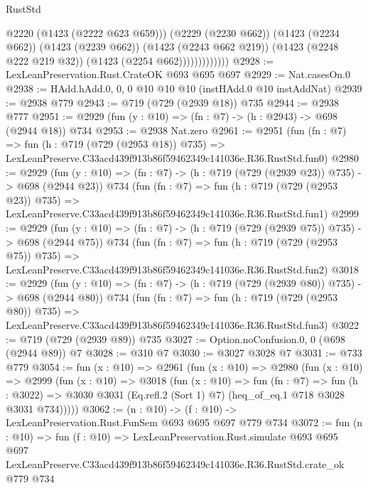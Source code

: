\begin{lexlean}{RustStd}
\begin{coremodule}
                            @2220
                            (@1423 (@2222 @623 @659)))
                          (@2229 (@2230 @662))
                          (@1423 (@2234 @662))
                          (@1423 (@2239 @662))
                          (@1423 (@2243 @662 @219))
                          (@1423 (@2248 @222 @219 @32))
                          (@1423 (@2254 @662)))))))))))))
@2928 := LexLeanPreservation.Rust.CrateOK @693 @695 @697
@2929 := Nat.casesOn.{0}
@2938 := HAdd.hAdd.{0, 0, 0} @10 @10 @10 (instHAdd.{0} @10 instAddNat)
@2939 := @2938 @779
@2943 := @719 (@729 (@2939 @18)) @735
@2944 := @2938 @777
@2951 := @2929 (fun (y : @10) => (fn : @7) -> (h : @2943) -> @698 (@2944 @18)) @734
@2953 := @2938 Nat.zero
@2961 := @2951
    (fun (fn : @7) =>
    fun (h : @719 (@729 (@2953 @18)) @735) =>
    LexLeanPreserve.C33acd439f913b86f59462349c141036e.R36.RustStd.fun0)
@2980 := @2929
    (fun (y : @10) => (fn : @7) -> (h : @719 (@729 (@2939 @23)) @735) -> @698 (@2944 @23))
    @734
    (fun (fn : @7) =>
    fun (h : @719 (@729 (@2953 @23)) @735) =>
    LexLeanPreserve.C33acd439f913b86f59462349c141036e.R36.RustStd.fun1)
@2999 := @2929
    (fun (y : @10) => (fn : @7) -> (h : @719 (@729 (@2939 @75)) @735) -> @698 (@2944 @75))
    @734
    (fun (fn : @7) =>
    fun (h : @719 (@729 (@2953 @75)) @735) =>
    LexLeanPreserve.C33acd439f913b86f59462349c141036e.R36.RustStd.fun2)
@3018 := @2929
    (fun (y : @10) => (fn : @7) -> (h : @719 (@729 (@2939 @80)) @735) -> @698 (@2944 @80))
    @734
    (fun (fn : @7) =>
    fun (h : @719 (@729 (@2953 @80)) @735) =>
    LexLeanPreserve.C33acd439f913b86f59462349c141036e.R36.RustStd.fun3)
@3022 := @719 (@729 (@2939 @89)) @735
@3027 := Option.noConfusion.{0, 0} (@698 (@2944 @89)) @7
@3028 := @310 @7
@3030 := @3027 @3028 @7
@3031 := @733 @779
@3054 := fun (x : @10) =>
  @2961
    (fun (x : @10) =>
    @2980
      (fun (x : @10) =>
      @2999
        (fun (x : @10) =>
        @3018
          (fun (x : @10) =>
          fun (fn : @7) =>
          fun (h : @3022) =>
          @3030 @3031 (Eq.refl.{2} (Sort 1) @7) (heq_of_eq.{1} @718 @3028 @3031 @734)))))
@3062 := (n : @10) -> (f : @10) -> LexLeanPreservation.Rust.FunSem @693 @695 @697 @779 @734
@3072 := fun (n : @10) =>
  fun (f : @10) =>
  LexLeanPreservation.Rust.simulate
    @693
    @695
    @697
    LexLeanPreserve.C33acd439f913b86f59462349c141036e.R36.RustStd.crate_ok
    @779
    @734
\end{coremodule}
\end{lexlean}
